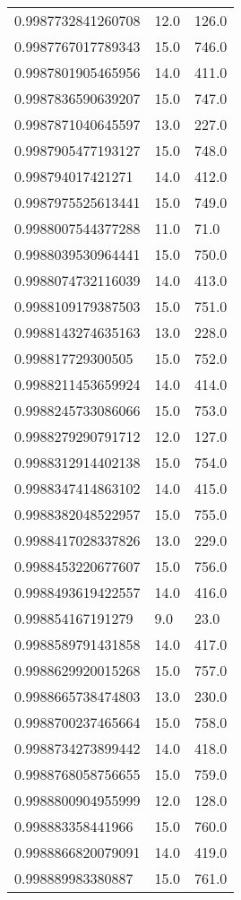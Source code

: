 \begin{center}
\begin{supertabular}[H]{p{0.30\textwidth}p{0.05\textwidth}p{0.05\textwidth}}
0.9987732841260708 & 12.0 & 126.0 \\ 
0.9987767017789343 & 15.0 & 746.0 \\ 
0.9987801905465956 & 14.0 & 411.0 \\ 
0.9987836590639207 & 15.0 & 747.0 \\ 
0.9987871040645597 & 13.0 & 227.0 \\ 
0.9987905477193127 & 15.0 & 748.0 \\ 
0.998794017421271 & 14.0 & 412.0 \\ 
0.9987975525613441 & 15.0 & 749.0 \\ 
0.9988007544377288 & 11.0 & 71.0 \\ 
0.9988039530964441 & 15.0 & 750.0 \\ 
0.9988074732116039 & 14.0 & 413.0 \\ 
0.9988109179387503 & 15.0 & 751.0 \\ 
0.9988143274635163 & 13.0 & 228.0 \\ 
0.998817729300505 & 15.0 & 752.0 \\ 
0.9988211453659924 & 14.0 & 414.0 \\ 
0.9988245733086066 & 15.0 & 753.0 \\ 
0.9988279290791712 & 12.0 & 127.0 \\ 
0.9988312914402138 & 15.0 & 754.0 \\ 
0.9988347414863102 & 14.0 & 415.0 \\ 
0.9988382048522957 & 15.0 & 755.0 \\ 
0.9988417028337826 & 13.0 & 229.0 \\ 
0.9988453220677607 & 15.0 & 756.0 \\ 
0.9988493619422557 & 14.0 & 416.0 \\ 
0.998854167191279 & 9.0 & 23.0 \\ 
0.9988589791431858 & 14.0 & 417.0 \\ 
0.9988629920015268 & 15.0 & 757.0 \\ 
0.9988665738474803 & 13.0 & 230.0 \\ 
0.9988700237465664 & 15.0 & 758.0 \\ 
0.9988734273899442 & 14.0 & 418.0 \\ 
0.9988768058756655 & 15.0 & 759.0 \\ 
0.9988800904955999 & 12.0 & 128.0 \\ 
0.998883358441966 & 15.0 & 760.0 \\ 
0.9988866820079091 & 14.0 & 419.0 \\ 
0.998889983380887 & 15.0 & 761.0 \\ 

\end{supertabular}
\end{center}
